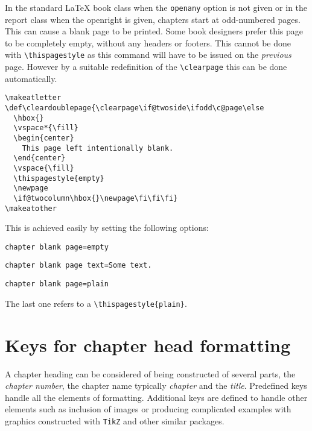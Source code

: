 In the standard LaTeX book class when the \texttt{openany} option is not given or in the report class when the openright is given, chapters start at odd-numbered pages. This can cause a blank page to be printed. Some book designers prefer this page to be completely empty, without any headers or footers. This cannot be done with \lstinline{\thispagestyle} as this command will have to be issued on the \textit{previous} page. However by a suitable redefinition of the
\lstinline{\clearpage} this can be done automatically.
\medskip

\begin{tcolorbox}
\begin{lstlisting}
\makeatletter
\def\cleardoublepage{\clearpage\if@twoside\ifodd\c@page\else
  \hbox{}
  \vspace*{\fill}
  \begin{center}
    This page left intentionally blank.
  \end{center}
  \vspace{\fill}
  \thispagestyle{empty}
  \newpage
  \if@twocolumn\hbox{}\newpage\fi\fi\fi}
\makeatother
\end{lstlisting}
\end{tcolorbox}
\medskip

This is achieved easily by setting the following options:
\bigskip

\begin{tcolorbox}
\lstinline{chapter blank page=empty}\par
\lstinline{chapter blank page text=Some text.}\par
\lstinline{chapter blank page=plain}\par
\end{tcolorbox}
\medskip



The last one refers to a \lstinline!\thispagestyle{plain}!.



\section{Keys for chapter head formatting}

A chapter heading can be considered of being constructed of several parts, the \textit{chapter number}, the chapter name typically \textit{chapter} and the \textit{title}. Predefined keys handle all the elements of formatting. Additional keys are defined to handle other elements such as inclusion of images or producing complicated examples with graphics constructed with \texttt{TikZ} and other similar packages.


